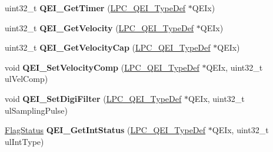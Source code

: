 \begin{DoxyCompactItemize}
\item 
\hypertarget{group___q_e_i___public___functions_ga8e7760e45c9e418531b6ed471af6fcf5}{uint32\-\_\-t {\bfseries \-Q\-E\-I\-\_\-\-Get\-Timer} (\hyperlink{struct_l_p_c___q_e_i___type_def}{\-L\-P\-C\-\_\-\-Q\-E\-I\-\_\-\-Type\-Def} $\ast$\-Q\-E\-Ix)}\label{group___q_e_i___public___functions_ga8e7760e45c9e418531b6ed471af6fcf5}

\item 
\hypertarget{group___q_e_i___public___functions_ga3c33034a0b9e7970b23c8a920fab8e30}{uint32\-\_\-t {\bfseries \-Q\-E\-I\-\_\-\-Get\-Velocity} (\hyperlink{struct_l_p_c___q_e_i___type_def}{\-L\-P\-C\-\_\-\-Q\-E\-I\-\_\-\-Type\-Def} $\ast$\-Q\-E\-Ix)}\label{group___q_e_i___public___functions_ga3c33034a0b9e7970b23c8a920fab8e30}

\item 
\hypertarget{group___q_e_i___public___functions_ga7f00688c61babd394246dd977cc2376a}{uint32\-\_\-t {\bfseries \-Q\-E\-I\-\_\-\-Get\-Velocity\-Cap} (\hyperlink{struct_l_p_c___q_e_i___type_def}{\-L\-P\-C\-\_\-\-Q\-E\-I\-\_\-\-Type\-Def} $\ast$\-Q\-E\-Ix)}\label{group___q_e_i___public___functions_ga7f00688c61babd394246dd977cc2376a}

\item 
\hypertarget{group___q_e_i___public___functions_ga96cf402337c54de8c3dbd7a1cafcdf0f}{void {\bfseries \-Q\-E\-I\-\_\-\-Set\-Velocity\-Comp} (\hyperlink{struct_l_p_c___q_e_i___type_def}{\-L\-P\-C\-\_\-\-Q\-E\-I\-\_\-\-Type\-Def} $\ast$\-Q\-E\-Ix, uint32\-\_\-t ul\-Vel\-Comp)}\label{group___q_e_i___public___functions_ga96cf402337c54de8c3dbd7a1cafcdf0f}

\item 
\hypertarget{group___q_e_i___public___functions_ga0bf67f0991855cac62350ab4183a03b1}{void {\bfseries \-Q\-E\-I\-\_\-\-Set\-Digi\-Filter} (\hyperlink{struct_l_p_c___q_e_i___type_def}{\-L\-P\-C\-\_\-\-Q\-E\-I\-\_\-\-Type\-Def} $\ast$\-Q\-E\-Ix, uint32\-\_\-t ul\-Sampling\-Pulse)}\label{group___q_e_i___public___functions_ga0bf67f0991855cac62350ab4183a03b1}

\item 
\hypertarget{group___q_e_i___public___functions_ga0c54cbf8a5d51b741b5c364632ed523b}{\hyperlink{group___l_p_c___types___public___types_ga89136caac2e14c55151f527ac02daaff}{\-Flag\-Status} {\bfseries \-Q\-E\-I\-\_\-\-Get\-Int\-Status} (\hyperlink{struct_l_p_c___q_e_i___type_def}{\-L\-P\-C\-\_\-\-Q\-E\-I\-\_\-\-Type\-Def} $\ast$\-Q\-E\-Ix, uint32\-\_\-t ul\-Int\-Type)}\label{group___q_e_i___public___functions_ga0c54cbf8a5d51b741b5c364632ed523b}


\end{DoxyCompactItemize}

